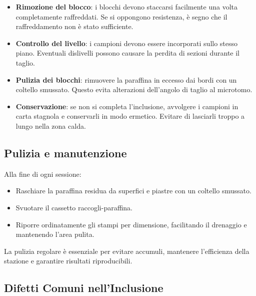 \begin{itemize}
  \item \textbf{Rimozione del blocco}: i blocchi devono staccarsi facilmente una volta completamente raffreddati. Se si oppongono resistenza, è segno che il raffreddamento non è stato sufficiente.
  
  \item \textbf{Controllo del livello}: i campioni devono essere incorporati sullo stesso piano. Eventuali dislivelli possono causare la perdita di sezioni durante il taglio.
  
  \item \textbf{Pulizia dei blocchi}: rimuovere la paraffina in eccesso dai bordi con un coltello smussato. Questo evita alterazioni dell'angolo di taglio al microtomo.
  
  \item \textbf{Conservazione}: se non si completa l’inclusione, avvolgere i campioni in carta stagnola e conservarli in modo ermetico. Evitare di lasciarli troppo a lungo nella zona calda.
\end{itemize}

\subsection{Pulizia e manutenzione}

Alla fine di ogni sessione:

\begin{itemize}
  \item Raschiare la paraffina residua da superfici e piastre con un coltello smussato.
  \item Svuotare il cassetto raccogli-paraffina.
  \item Riporre ordinatamente gli stampi per dimensione, facilitando il drenaggio e mantenendo l’area pulita.
\end{itemize}
La pulizia regolare è essenziale per evitare accumuli, mantenere l'efficienza della stazione e garantire risultati riproducibili.



\subsection{Difetti Comuni nell'Inclusione}

